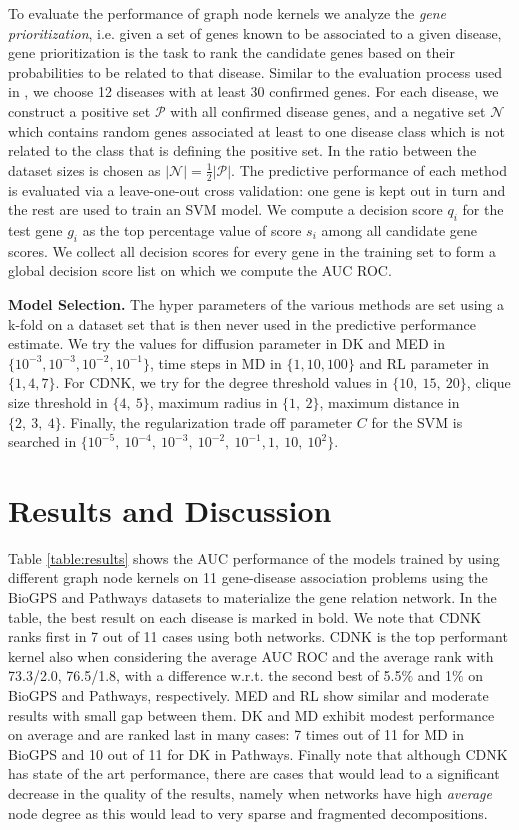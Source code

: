 \documentclass{esannV2}
\begin{document}
To evaluate the performance of graph node kernels we analyze the {\em gene prioritization}, i.e. given a set of genes known to be associated to a given disease, gene prioritization is the task to rank the candidate genes based on their probabilities to be related to that disease. Similar to the evaluation process used in \cite{medk}, we choose 12 diseases with at least 30 confirmed genes. For each disease, we construct a positive set $\mathcal{P}$ with all confirmed disease genes, and a negative set $\mathcal{N}$ which contains random genes associated at least to one disease class which is not related to the class that is defining the positive set. In \cite{medk} the ratio between the dataset sizes is chosen as $\vert \mathcal{N} \vert =
\frac{1}{2} \vert \mathcal{P} \vert$. The predictive performance of each method is evaluated via a leave-one-out cross validation: one gene is kept out in turn and the rest are used to train an SVM model. We compute a decision score $q_i$ for the test gene $g_i$ as the top percentage value of score $s_i$ among all candidate gene scores. We collect all decision scores for every gene in the training set to form a global decision score list on which we compute the AUC ROC.

\textbf{Model Selection.}
The hyper parameters of the various methods are set using a k-fold on a dataset set that is then never used in the predictive performance estimate. We try the values for diffusion parameter in DK and MED in $\lbrace 10^{-3}, 10^{-3}, 10^{-2}, 10^{-1} \rbrace$, time steps in MD in $\lbrace 1, 10, 100 \rbrace$ and RL parameter in $\lbrace 1, 4, 7 \rbrace$. For CDNK, we try for the degree threshold values in $\lbrace 10,\ 15,\ 20 \rbrace$, clique size threshold in $\lbrace 4,\ 5 \rbrace$, maximum radius in $\lbrace 1,\ 2 \rbrace$, maximum distance in $\lbrace 2,\ 3,\ 4 \rbrace$. Finally, the regularization trade off parameter $C$ for the SVM is searched in $\lbrace 10^{-5},  \ 10^{-4}, \ 10^{-3},\ 10^{-2},\ 10^{-1}, 1,\ 10,\ 10^2 \rbrace$.


\section{Results and Discussion}
\label{results_discussion}
Table \ref{table:results} shows the AUC performance of the models trained by using different graph node kernels on 11 gene-disease association problems using the BioGPS and Pathways datasets to materialize the gene relation network. In the table, the best result on each disease is marked in bold. We note that CDNK ranks first in 7 out of 11 cases using  both networks. CDNK is the top performant kernel also when considering the average AUC ROC and the average rank with 73.3/2.0, 76.5/1.8, with a difference w.r.t. the second best of 5.5$\%$ and 1$\%$ on BioGPS and Pathways, respectively. MED and RL show similar and moderate results with small gap between them. DK and MD exhibit modest performance on average and  are ranked last in many cases: 7 times out of 11 for MD in BioGPS and 10 out of 11 for DK in Pathways. Finally note that although CDNK has state of the art performance, there are cases that would lead to a significant decrease in the quality of the results, namely when networks have high {\em average} node degree as this would lead to
very sparse and fragmented decompositions.
\end{document}
